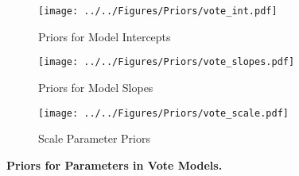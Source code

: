 \documentclass[12pt]{article}
\begin{document}
\begin{appendices}
\begin{figure*}[t]
    \centering
    \begin{subfigure}[b]{0.45\textwidth}
        \centering
        \texttt{[image: ../../Figures/Priors/vote\_int.pdf]}
        \caption{Priors for Model Intercepts}
    \end{subfigure}
    \begin{subfigure}[b]{0.45\textwidth}
        \centering
        \texttt{[image: ../../Figures/Priors/vote\_slopes.pdf]}
        \caption{Priors for Model Slopes}
    \end{subfigure}
    \begin{subfigure}[b]{0.45\textwidth}
    	\centering
        \texttt{[image: ../../Figures/Priors/vote\_scale.pdf]}
        \caption{Scale Parameter Priors}
    \end{subfigure}
    \caption{\textbf{Priors for Parameters in Vote Models.}}
    \label{fig: priors}
\end{figure*}


\end{appendices}
\end{document}
